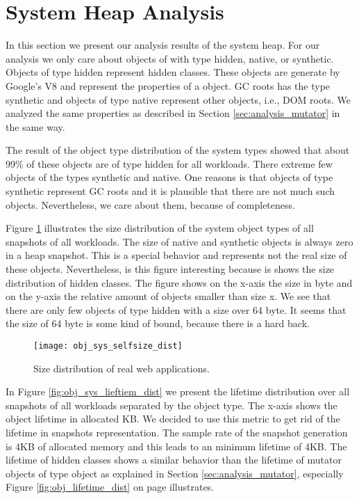 
\section{System Heap Analysis}  \label{sec:analysis_system}

In this section we present our analysis results of the system heap. For our analysis we only care about objects of with type hidden, native, or synthetic. Objects of type hidden represent hidden classes. These objects are generate by Google's V8 and represent the properties of a object. GC roots has the type synthetic and objects of type native represent other objects, i.e., DOM roots. We analyzed the same properties as described in Section \ref{sec:analysis_mutator} in the same way.

The result of the object type distribution of the system types showed that about 99\% of these objects are of type hidden for all workloads. There extreme few objects of the types synthetic and native. One reasons is that objects of type synthetic represent GC roots and it is plausible that there are not much such objects. Nevertheless, we care about them, because of completeness.

Figure \ref{fig:obj_sys_selfsize_dist} illustrates the size distribution of the system object types of all snapshots of all workloads. The size of native and synthetic objects is always zero in a heap snapshot. This is a special behavior and represents not the real size of these objects. Nevertheless, is this figure interesting because is shows the size distribution of hidden classes. The figure shows on the x-axis the size in byte and on the y-axis the relative amount of objects smaller than size x. We see that there are only few objects of type hidden with a size over 64 byte. It seems that the size of 64 byte is some kind of bound, because there is a hard back. 

\begin{figure}
	\centering
	\texttt{[image: obj\_sys\_selfsize\_dist]}
	\caption{Size distribution of real web applications.}
	\label{fig:obj_sys_selfsize_dist}
\end{figure}

In Figure \ref{fig:obj_sys_lieftiem_dist} we present the lifetime distribution over all snapshots of all workloads separated by the object type. The x-axis shows the object lifetime in allocated KB. We decided to use this metric to get rid of the lifetime in snapshots representation. The sample rate of the snapshot generation is 4KB of allocated memory and this leads to an minimum lifetime of 4KB. The lifetime of hidden classes shows a similar behavior than the lifetime of mutator objects of type object as explained in Section \ref{sec:analysis_mutator}, especially Figure \ref{fig:obj_lifetime_dist} on page \pageref{fig:obj_lifetime_dist} illustrates. 

